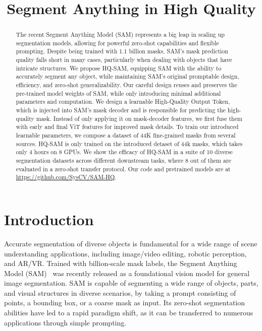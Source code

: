 \title{Segment Anything in High Quality}

\begin{abstract}
The recent Segment Anything Model (SAM) represents a big leap in scaling up segmentation models, allowing for powerful zero-shot capabilities and flexible prompting. Despite being trained with 1.1 billion masks, SAM's mask prediction quality falls short in many cases, particularly when dealing with objects that have intricate structures. We propose HQ-SAM, equipping SAM with the ability to accurately segment any object, while maintaining SAM's original promptable design, efficiency, and zero-shot generalizability. Our careful design reuses and preserves the pre-trained model weights of SAM, while only introducing minimal additional parameters and computation. We design a learnable High-Quality Output Token, which is injected into SAM's mask decoder and is responsible for predicting the high-quality mask. Instead of only applying it on mask-decoder features, we first fuse them with early and final ViT features for improved mask details. To train our introduced learnable parameters, we compose a dataset of 44K fine-grained masks from several sources. HQ-SAM is only trained on the introduced detaset of 44k masks, which takes only 4 hours on 8 GPUs. We show the efficacy of HQ-SAM in a suite of 10 diverse segmentation datasets across different downstream tasks, where 8 out of them are evaluated in a zero-shot transfer protocol. Our code and pretrained models are at \url{https://github.com/SysCV/SAM-HQ}.
\end{abstract}

\section{Introduction}

Accurate segmentation of diverse objects is fundamental for a wide range of scene understanding applications, including image/video editing, robotic perception, and AR/VR. Trained with billion-scale mask labels, the Segment Anything Model (SAM)~\cite{sam} was recently released as a foundational vision model for general image segmentation. SAM is capable of segmenting a wide range of objects, parts, and visual structures in diverse scenarios, by taking a prompt consisting of points, a bounding box, or a coarse mask as input. Its zero-shot segmentation abilities have led to a rapid paradigm shift, as it can be transferred to numerous applications through simple prompting.

